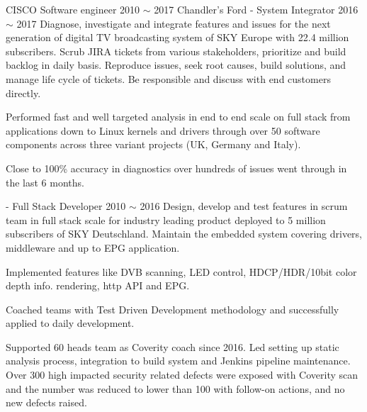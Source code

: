 \begin{cventries}
  \cventry
    {CISCO}
    {Software engineer}
    {2010 $\sim$ 2017}
    {Chandler's Ford}
    {}
  \cventryX
    {- System Integrator}
    {2016 $\sim$ 2017}
    {Diagnose, investigate and integrate features and issues for the next generation of digital TV broadcasting system of SKY Europe with 22.4 million subscribers. Scrub JIRA tickets from various stakeholders, prioritize and build backlog in daily basis. Reproduce issues, seek root causes, build solutions, and manage life cycle of tickets. Be responsible and discuss with end customers directly.}
    {
      \begin{cvitems}
        \item {Performed fast and well targeted analysis in end to end scale on full stack from applications down to Linux kernels and drivers through over 50 software components across three variant projects (UK, Germany and Italy).}
        \item {Close to 100\% accuracy in diagnostics over hundreds of issues went through in the last 6 months.}
      \end{cvitems}
    }
  \cventryX
    {- Full Stack Developer}
    {2010 $\sim$ 2016}
    {Design, develop and test features in scrum team in full stack scale for industry leading product deployed to 5 million subscribers of SKY Deutschland. Maintain the embedded system covering drivers, middleware and up to EPG application.}
    {
      \begin{cvitems}
        \item {Implemented features like DVB scanning, LED control, HDCP/HDR/10bit color depth info. rendering, http API and EPG.}
        \item {Coached teams with Test Driven Development methodology and successfully applied to daily development. }
        \item {Supported 60 heads team as Coverity coach since 2016. Led setting up static analysis process, integration to build system and Jenkins pipeline maintenance. Over 300 high impacted security related defects were exposed with Coverity scan and the number was reduced to lower than 100 with follow-on actions, and no new defects raised.}
      \end{cvitems}
    }
    \begin{flushleft}
    \end{flushleft}
\end{cventries}
